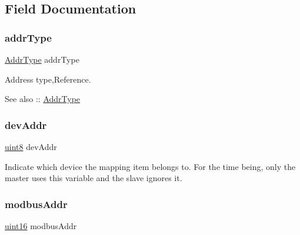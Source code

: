 \subsection{Field Documentation}
\mbox{\label{struct_p_map_table_item_a2d1a1a7dddf870379b724a411683484a}} 
\subsubsection{\texorpdfstring{addr\+Type}{addrType}}
{\footnotesize\ttfamily \mbox{\hyperlink{_m_d___r_t_u___map_table_8h_a5a2ca199266aafd1a2d30391d6620892}{Addr\+Type}} addr\+Type}



Address type,Reference. 

\begin{DoxySeeAlso}{See also}
\+:\+: \mbox{\hyperlink{_m_d___r_t_u___map_table_8h_a5a2ca199266aafd1a2d30391d6620892}{Addr\+Type}} 
\end{DoxySeeAlso}
\mbox{\label{struct_p_map_table_item_a3e1d7e4094f9c89a5f02dc3a5097864e}} 
\subsubsection{\texorpdfstring{dev\+Addr}{devAddr}}
{\footnotesize\ttfamily \mbox{\hyperlink{_m_d___r_t_u___type_8h_adde6aaee8457bee49c2a92621fe22b79}{uint8}} dev\+Addr}



Indicate which device the mapping item belongs to. For the time being, only the master uses this variable and the slave ignores it. 

\mbox{\label{struct_p_map_table_item_aaa9fbc3062ec6213a5b91318077881d0}} 
\subsubsection{\texorpdfstring{modbus\+Addr}{modbusAddr}}
{\footnotesize\ttfamily \mbox{\hyperlink{_m_d___r_t_u___type_8h_a05f6b0ae8f6a6e135b0e290c25fe0e4e}{uint16}} modbus\+Addr}



